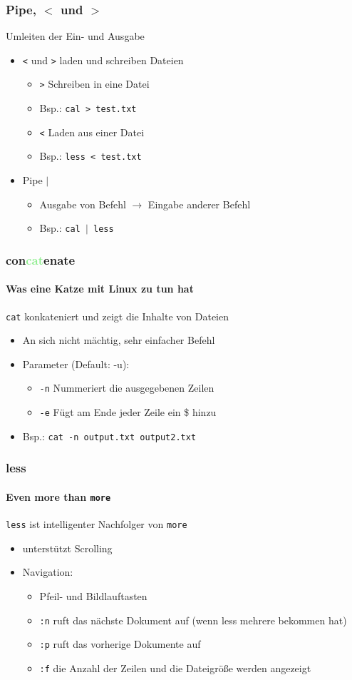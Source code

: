 \documentclass[12pt,utf8]{beamer}
\begin{document}
\begin{frame}
\frametitle{Pipe, $<$ und $>$ }
Umleiten der Ein- und Ausgabe
\begin{itemize}
	\item \texttt{<} und \texttt{>} laden und schreiben Dateien
	\begin{itemize}[<+->]
		\item \texttt{>} Schreiben in eine Datei
		\item Bsp.: \texttt{cal > test.txt}
		\item \texttt{<} Laden aus einer Datei
		\item Bsp.: \texttt{less < test.txt}
	\end{itemize}
	\item Pipe \texttt{$\mid$}
	\begin{itemize}[<+->]
		\item Ausgabe von Befehl $\to$ Eingabe anderer Befehl
		\item Bsp.: \texttt{cal $\mid$ less}
	\end{itemize}
\end{itemize}
\end{frame}

\begin{frame}
	\frametitle{con\textcolor{lightGreen}{cat}enate}
	\framesubtitle{Was eine Katze mit Linux zu tun hat}
	\texttt{cat} konkateniert und zeigt die Inhalte von Dateien
	\begin{itemize}
		\item An sich nicht mächtig, sehr einfacher Befehl
		\item Parameter (Default: -u):
		\begin{itemize}[<+->]
			\item \texttt{-n} Nummeriert die ausgegebenen Zeilen 
			\item \texttt{-e} Fügt am Ende jeder Zeile ein \$ hinzu
		\end{itemize}
		\item Bsp.: \texttt{cat -n output.txt output2.txt}
	\end{itemize}
\end{frame}

\begin{frame}
\frametitle{less}
\framesubtitle{Even more than \texttt{more}}
\texttt{less} ist intelligenter Nachfolger von \texttt{more}
\begin{itemize}
	\item unterstützt Scrolling
	\item Navigation:
	\begin{itemize}[<+->]
		\item Pfeil- und Bildlauftasten
		\item \texttt{:n} ruft das nächste Dokument auf (wenn less mehrere bekommen hat)
		\item \texttt{:p} ruft das vorherige Dokumente auf
		\item \texttt{:f} die Anzahl der Zeilen und die Dateigröße werden angezeigt
	\end{itemize}
\end{itemize}
\end{frame}
\end{document}
